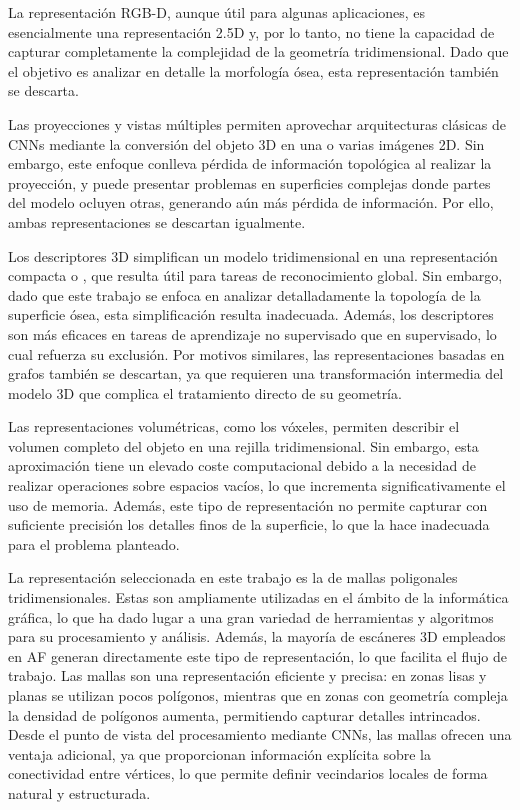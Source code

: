 La representación RGB-D, aunque útil para algunas aplicaciones, es esencialmente una representación 2.5D y, por lo tanto, no tiene la capacidad de capturar completamente la complejidad de la geometría tridimensional. Dado que el objetivo es analizar en detalle la morfología ósea, esta representación también se descarta.

Las proyecciones y vistas múltiples permiten aprovechar arquitecturas clásicas de CNNs mediante la conversión del objeto 3D en una o varias imágenes 2D. Sin embargo, este enfoque conlleva pérdida de información topológica al realizar la proyección, y puede presentar problemas en superficies complejas donde partes del modelo ocluyen otras, generando aún más pérdida de información. Por ello, ambas representaciones se descartan igualmente.

Los descriptores 3D simplifican un modelo tridimensional en una representación compacta o , que resulta útil para tareas de reconocimiento global. Sin embargo, dado que este trabajo se enfoca en analizar detalladamente la topología de la superficie ósea, esta simplificación resulta inadecuada. Además, los descriptores son más eficaces en tareas de aprendizaje no supervisado que en supervisado, lo cual refuerza su exclusión. Por motivos similares, las representaciones basadas en grafos también se descartan, ya que requieren una transformación intermedia del modelo 3D que complica el tratamiento directo de su geometría.

Las representaciones volumétricas, como los vóxeles, permiten describir el volumen completo del objeto en una rejilla tridimensional. Sin embargo, esta aproximación tiene un elevado coste computacional debido a la necesidad de realizar operaciones sobre espacios vacíos, lo que incrementa significativamente el uso de memoria. Además, este tipo de representación no permite capturar con suficiente precisión los detalles finos de la superficie, lo que la hace inadecuada para el problema planteado.

La representación seleccionada en este trabajo es la de mallas poligonales tridimensionales. Estas son ampliamente utilizadas en el ámbito de la informática gráfica, lo que ha dado lugar a una gran variedad de herramientas y algoritmos para su procesamiento y análisis. Además, la mayoría de escáneres 3D empleados en AF generan directamente este tipo de representación, lo que facilita el flujo de trabajo. Las mallas son una representación eficiente y precisa: en zonas lisas y planas se utilizan pocos polígonos, mientras que en zonas con geometría compleja la densidad de polígonos aumenta, permitiendo capturar detalles intrincados. Desde el punto de vista del procesamiento mediante CNNs, las mallas ofrecen una ventaja adicional, ya que proporcionan información explícita sobre la conectividad entre vértices, lo que permite definir vecindarios locales de forma natural y estructurada.

